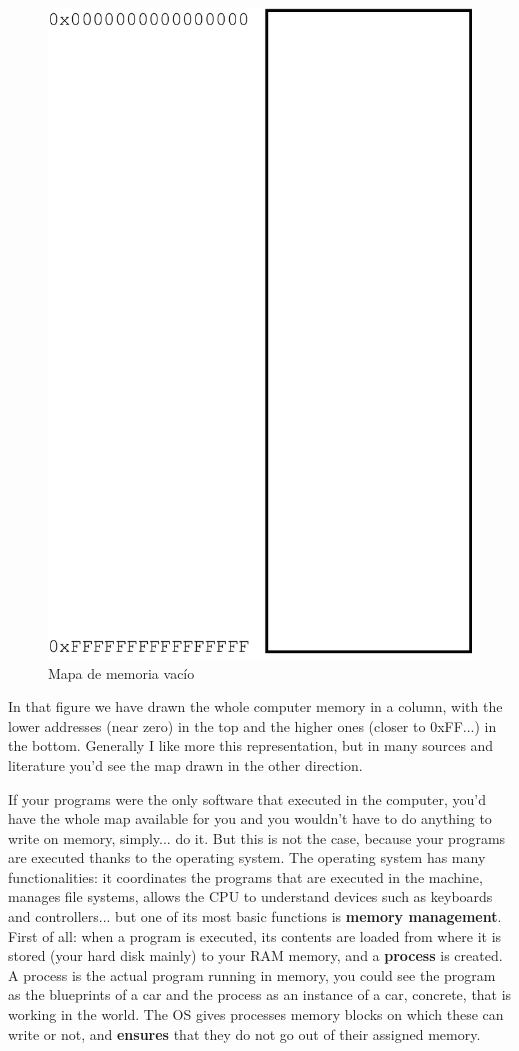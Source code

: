 \documentclass[a4paper]{article}
\begin{document}
\begin{figure}[H]
    \center
    \includegraphics[width=0.5\linewidth]{emptyMemoryMap}
    \caption{Mapa de memoria vacío}
    \label{img:emptyMemoryMap}
\end{figure}

In that figure we have drawn the whole computer memory in a column, with
the lower addresses (near zero) in the top and the higher ones (closer to
0xFF...) in the bottom. Generally I like more this representation, but in
many sources and literature you'd see the map drawn in the other direction.

If your programs were the only software that executed in the computer, you'd
have the whole map available for you and you wouldn't have to do anything to
write on memory, simply... do it. But this is not the case, because your
programs are executed thanks to the operating system. The operating system has
many functionalities: it coordinates the programs that are executed in the
machine, manages file systems, allows the CPU to understand devices such as
keyboards and controllers... but one of its most basic functions is \textbf{
memory management}. First of all: when a program is executed, its contents are
loaded from where it is stored (your hard disk mainly) to your RAM memory, and a
\textbf{process} is created. A process is the actual program running in memory,
you could see the program as the blueprints of a car and the process as an
instance of a car, concrete, that is working in the world.
The OS gives processes memory blocks on which these can
write or not, and \textbf{ensures} that they do not go out of their assigned
memory.
\end{document}
